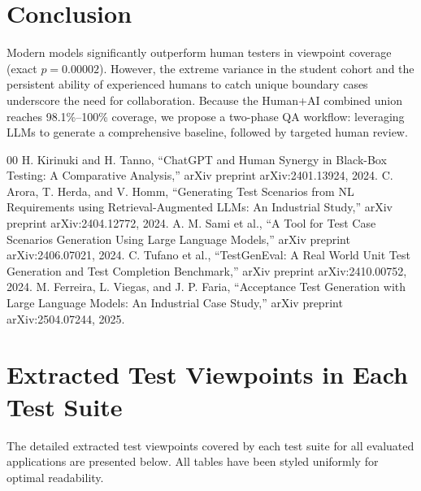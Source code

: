 \documentclass[conference]{IEEEtran}
\begin{document}
\section{Conclusion}
Modern models significantly outperform human testers in viewpoint coverage (exact $p = 0.00002$). However, the extreme variance in the student cohort and the persistent ability of experienced humans to catch unique boundary cases underscore the need for collaboration. Because the Human+AI combined union reaches 98.1\%--100\% coverage, we propose a two-phase QA workflow: leveraging LLMs to generate a comprehensive baseline, followed by targeted human review.

\begin{thebibliography}{00}
 H. Kirinuki and H. Tanno, ``ChatGPT and Human Synergy in Black-Box Testing: A Comparative Analysis,'' arXiv preprint arXiv:2401.13924, 2024.
 C. Arora, T. Herda, and V. Homm, ``Generating Test Scenarios from NL Requirements using Retrieval-Augmented LLMs: An Industrial Study,'' arXiv preprint arXiv:2404.12772, 2024.
 A. M. Sami et al., ``A Tool for Test Case Scenarios Generation Using Large Language Models,'' arXiv preprint arXiv:2406.07021, 2024.
 C. Tufano et al., ``TestGenEval: A Real World Unit Test Generation and Test Completion Benchmark,'' arXiv preprint arXiv:2410.00752, 2024.
 M. Ferreira, L. Viegas, and J. P. Faria, ``Acceptance Test Generation with Large Language Models: An Industrial Case Study,'' arXiv preprint arXiv:2504.07244, 2025.
\end{thebibliography}

\clearpage
\appendix
\section{Extracted Test Viewpoints in Each Test Suite}
The detailed extracted test viewpoints covered by each test suite for all evaluated applications are presented below. All tables have been styled uniformly for optimal readability.
\end{document}
